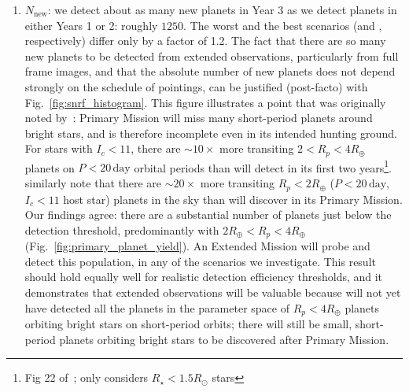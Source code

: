 \begin{enumerate}
	\item $N_\mathrm{new}$: we detect about as many new planets in Year 3 as we detect planets in either Years 1 or 2: roughly $1250$.
	The worst and the best scenarios (\elong\:and \hemis, respectively) differ 
	only by a factor of 1.2.
	The fact that there are so many new planets to be detected from extended 
	observations, particularly from full frame images, and that the absolute 
	number of new planets does not depend strongly on the schedule of pointings,
	can be justified (post-facto) with Fig.~\ref{fig:snrf_histogram}.
	This figure illustrates a point that was originally noted by~:
        \tesss Primary Mission will miss many short-period planets around bright stars, and is therefore
        incomplete even in its intended hunting ground.
        For stars with $I_c<11$, there are $\sim\! 10\times$ more transiting 
        $2<R_p<4R_\oplus$ planets on $P<20\,\mathrm{day}$ orbital periods than 
        \tess will detect in its first two years\footnote{Fig 22
        of~; only considers $R_\star<1.5R_\odot$ 
        stars}.
         similarly note that there are $\sim\! 
        20\times$ more transiting $R_p<2R_\oplus$ ($P<20\,\mathrm{day}$, 
        $I_c<11$ host star) planets in the sky than \tess will discover in 
        its Primary Mission.
	Our findings agree: there are a substantial number of planets just below the detection threshold, predominantly with $2R_\oplus < R_p <4R_\oplus$ (Fig.~\ref{fig:primary_planet_yield}).
	An Extended Mission will probe and detect this population, in any of the scenarios we investigate.
	This result should hold equally well for realistic detection efficiency 
	thresholds, and it demonstrates that extended observations will be valuable 
	because \tess will not yet have detected all the planets in the parameter 
	space of $R_p<4R_\oplus$ planets orbiting bright stars on short-period 
	orbits;
	there will still be small, short-period planets orbiting bright stars to 
	be discovered after \tesss Primary Mission.



\end{enumerate}

